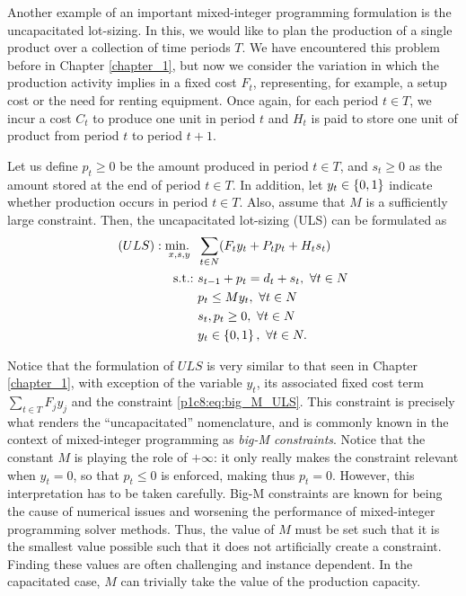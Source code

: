 Another example of an important mixed-integer programming formulation is the uncapacitated lot-sizing. In this, we would like to plan the production of a single product over a collection of time periods $T$. We have encountered this problem before in Chapter \ref{chapter_1}, but now we consider the variation in which the production activity implies in a fixed cost $F_t$, representing, for example, a setup cost or the need for renting equipment. Once again, for each period $t \in T$, we incur a cost $C_t$ to produce one unit in period $t$ and $H_t$ is paid to store one unit of product from period $t$ to period $t+1$.

Let us define $p_t \geq 0$ be the amount produced in period $t \in T$, and $s_t \geq 0$ as the amount stored at the end of period $t \in T$. In addition, let $y_t \in \left\{ 0,1 \right \}$ indicate whether production occurs in period $t \in T$. Also, assume that $M$ is a sufficiently large constraint. Then, the uncapacitated lot-sizing (ULS) can be formulated as
%
\begin{align}
	(ULS) : \mathop{\text{min.~}}_{x,s,y} \ & \sum_{t \in N} (F_ty_t + P_tp_t + H_ts_t) \nonumber \\
	\mathop{\text{s.t.:~}} & s_{t-1} + p_t = d_t + s_t, \ \forall t \in N \nonumber \\
	& p_t \leq My_t, \ \forall t \in N  \label{p1c8:eq:big_M_ULS}\\
	&s_t, p_t \geq 0, \ \forall t \in N \nonumber \\
	&y_t \in \left\{ 0,1 \right \}, \ \forall t \in N. \nonumber
\end{align} 

Notice that the formulation of $ULS$ is very similar to that seen in Chapter \ref{chapter_1}, with exception of the variable $y_t$, its associated fixed cost term $\sum_{t \in T} F_jy_j$ and the constraint \eqref{p1c8:eq:big_M_ULS}. This constraint is precisely what renders the ``uncapacitated'' nomenclature, and is commonly known in the context of mixed-integer programming as \emph{big-M constraints}. Notice that the constant $M$ is playing the role of $+\infty$: it only really makes the constraint relevant when $y_t = 0$, so that $p_t \le 0$ is enforced, making thus $p_t = 0$. However, this interpretation has to be taken carefully. Big-M constraints are known for being the cause of numerical issues and worsening the performance of mixed-integer programming solver methods. Thus, the value of $M$ must be set such that it is the smallest value possible such that it does not artificially create a constraint. Finding these values are often challenging and instance dependent. In the capacitated case, $M$ can trivially take the value of the production capacity. 
 

